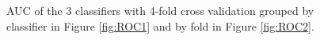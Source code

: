 \documentclass[a4paper,11pt]{article}
\begin{document}
\begin{figure}[H]%
	\centering
	\caption{\footnotesize AUC of the 3 classifiers with 4-fold cross validation grouped by classifier in Figure \ref{fig:ROC1} and by fold in Figure \ref{fig:ROC2}. }
	\label{fig:RealROC}
\end{figure}
\end{document}
